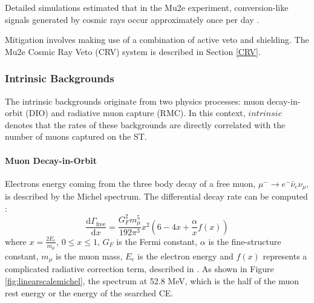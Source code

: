 Detailed simulations estimated that in the Mu2e experiment, 
conversion-like signals generated by cosmic rays occur approximately once per day \cite{CRVposter}.

Mitigation involves making use of a combination of active veto and shielding.
The Mu2e Cosmic Ray Veto (CRV) system is described in Section \ref{CRV}.

\subsubsection{Intrinsic Backgrounds}
The intrinsic backgrounds  originate from two physics processes: 
muon decay-in-orbit (DIO) and radiative muon capture (RMC). In this context, 
$intrinsic$ denotes that the rates of these backgrounds are directly correlated 
with the number of muons captured on the ST.



\paragraph{Muon Decay-in-Orbit}
Electrons energy coming from the three body decay of a free muon, 
$\mu^- \rightarrow e^- \bar{\nu}_e \nu_\mu$, is described by the Michel 
spectrum. The differential decay rate can be computed \cite{michel}:
\begin{equation}
    \frac{\text{d}\Gamma_{\text{free}}}{\text{d}x}= \frac{G^2_F m^5_\mu}{192 \pi^3}x^2(6-4x+\frac{\alpha}{x}f(x)) 
\end{equation}
where $x=\frac{2 E_e}{m_\mu}$, $0\leq x\leq 1$, $G_F$ is the Fermi constant, 
$\alpha$ is the fine-structure constant, $m_\mu$ is the muon mass, $E_e$ is the 
electron energy and $f (x)$ represents a complicated radiative correction term, 
described in \cite{PhysRev.113.1652}.
{\red
As shown in Figure \ref{fig:linearscalemichel}, the spectrum 
 at 52.8 MeV, which is the half of the muon rest energy or the energy of the searched CE.
}


